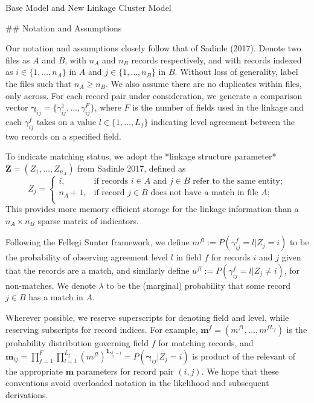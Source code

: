 \documentclass[12pt,a4paper]{article}\usepackage[]{graphicx}\usepackage[]{color}
\begin{document}
	\begin{center} Base Model and New Linkage Cluster Model
	\end{center}

	\begin{flushleft}
	\setlength{\parskip}{1em}

## Notation and Assumptions

Our notation and assumptions closely follow that of Sadinle (2017). Denote two files as $A$ and $B$, with $n_A$ and $n_B$ records respectively, and with records indexed as $i \in \{1, \ldots, n_A\}$ in $A$ and $j \in \{1, \ldots, n_B\}$ in $B$. Without loss of generality, label the files such that $n_A \geq n_B$. We also assume there are no duplicates within files, only across. For each record pair under consideration, we generate a comparison vector $\boldsymbol{\gamma}_{ij} = \{\gamma_{ij}^1, \ldots, \gamma_{ij}^F\}$, where  $F$ is the number of fields used in the linkage and each $\gamma_{ij}^f$ takes on a value $l \in \{1, \ldots, L_f\}$ indicating level agreement between the two records on a specified field.

To indicate matching status, we adopt the *linkage structure parameter* $\mathbf{Z} = (Z_1, \ldots, Z_{n_A})$ from Sadinle 2017, defined as
$$Z_j=\begin{cases}
    i,  & \text{if records } i\in A \text{ and } j\in B \text{ refer to the same entity}; \\
    n_A + 1,  & \text{if record } j\in B \text{ does not have a match in file } A; \\
\end{cases}$$
This provides more memory efficient storage for the linkage information than a $n_A \times n_B$ sparse matrix of indicators.

Following the Fellegi Sunter framework, we define $m^{fl}:= P(\gamma_{ij}^f = l |Z_j = i)$ to be the probability of observing agreement level $l$ in field $f$ for records $i$ and $j$ given that the records are a match, and similarly define $u^{fl}:= P(\gamma_{ij}^f = l |Z_j \neq i)$, for non-matches. We denote $\lambda$ to be the (marginal) probability that some record $j \in B$ has a match in $A$.

Wherever possible, we reserve superscripts for denoting field and level, while reserving subscripts for record indices. For example, $\mathbf{m}^f = (m^{f1}, \ldots, m^{fL_f})$ is the probability distribution governing field $f$ for matching records, and $\mathbf{m}_{ij}= \prod_{f=1}^{F}\prod_{l=1}^{L_f} \left(m^{fl}\right)^{\mathbf{1}_{\gamma_{ij}^f = l}} = P(\boldsymbol{\gamma}_{ij}|Z_j = i)$ is product of the relevant of the appropriate $\mathbf{m}$ parameters for record pair $(i,j)$. We hope that these conventions avoid overloaded notation in the likelihood and subsequent derivations.


\end{flushleft}
\end{document}
